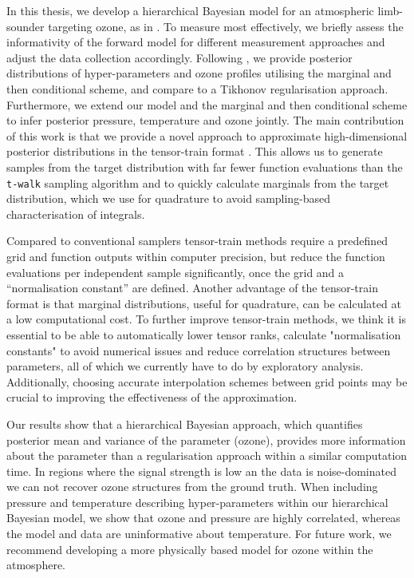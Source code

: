 In this thesis, we develop a hierarchical Bayesian model for an atmospheric limb-sounder targeting ozone, as in \cite{mipas2000handbook}.
To measure most effectively, we briefly assess the informativity of the forward model for different measurement approaches and adjust the data collection accordingly.
Following \cite{fox2016fast}, we provide posterior distributions of hyper-parameters and ozone profiles utilising the marginal and then conditional scheme, and compare to a Tikhonov regularisation approach.
Furthermore, we extend our model and the marginal and then conditional scheme to infer posterior pressure, temperature and ozone jointly.
The main contribution of this work is that we provide a novel approach to approximate high-dimensional posterior distributions in the tensor-train format \cite{cui2022deep}.
This allows us to generate samples from the target distribution with far fewer function evaluations than the \texttt{t-walk} sampling algorithm \cite{christen2010general} and to quickly calculate marginals from the target distribution, which we use for quadrature to avoid sampling-based characterisation of integrals.

Compared to conventional samplers tensor-train methods require a predefined grid and function outputs within computer precision, but reduce the function evaluations per independent sample significantly, once the grid and a ``normalisation constant'' are defined.
Another advantage of the tensor-train format is that marginal distributions, useful for quadrature, can be calculated at a low computational cost.
To further improve tensor-train methods, we think it is essential to be able to automatically lower tensor ranks, calculate "normalisation constants" to avoid numerical issues and reduce correlation structures between parameters, all of which we currently have to do by exploratory analysis.
Additionally, choosing accurate interpolation schemes between grid points may be crucial to improving the effectiveness of the approximation.

Our results show that a hierarchical Bayesian approach, which quantifies posterior mean and variance of the parameter (ozone), provides more information about the parameter than a regularisation approach within a similar computation time.
In regions where the signal strength is low an the data is noise-dominated we can not recover ozone structures from the ground truth.
When including pressure and temperature describing hyper-parameters within our hierarchical Bayesian model, we show that ozone and pressure are highly correlated, whereas the model and data are uninformative about temperature.
For future work, we recommend developing a more physically based model for ozone within the atmosphere.